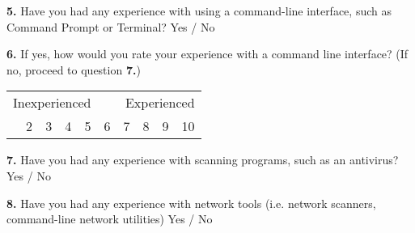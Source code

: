 \textbf{5.} Have you had any experience with using a command-line interface, such as Command Prompt or Terminal? \tab Yes / No

\vspace{2cm}

\textbf{6.} If yes, how would you rate your experience with a command line interface? (If no, proceed to question \textbf{7.})

\begin{center}
	\begin{table}[h]
	\begin{tabularx}{\textwidth}{XXXXXXXXXX}
	\multicolumn{5}{l}{Inexperienced} & \multicolumn{5}{r}{Experienced} \\
	\centering
	1    & 2    & 3    & 4    & 5    & 6    & 7    & 8    & 9    & 10
	\end{tabularx}
	\end{table}
\end{center}

\textbf{7.} Have you had any experience with scanning programs, such as an antivirus? \tab Yes / No

\vspace{0.5cm}

\textbf{8.} Have you had any experience with network tools (i.e. network scanners, command-line network utilities) \tab Yes / No

